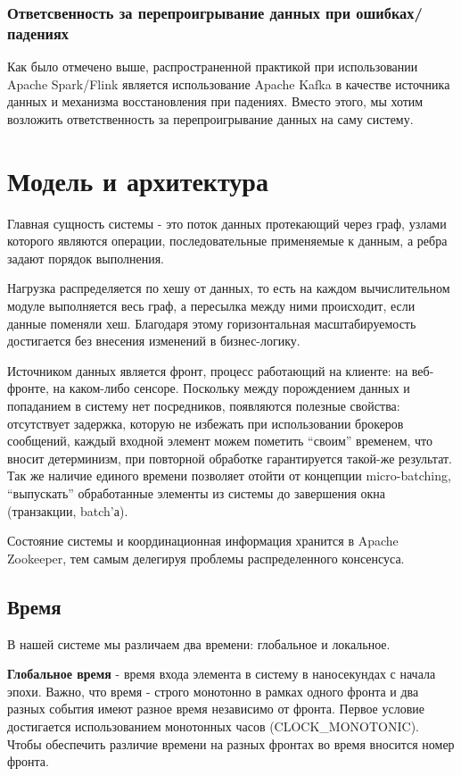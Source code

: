 \documentclass[14pt]{matmex-diploma-custom}
\begin{document}
\subsubsection{Ответсвенность за перепроигрывание данных при ошибках/падениях}

Как было отмечено выше, распространенной практикой при использовании Apache Spark/Flink является использование Apache Kafka в качестве источника данных и механизма восстановления при падениях. Вместо этого, мы хотим возложить ответственность за перепроигрывание данных на саму систему.

\section{Модель и архитектура}

Главная сущность системы - это поток данных протекающий через граф, узлами которого являются операции, последовательные применяемые к данным, а ребра задают порядок выполнения.

Нагрузка распределяется по хешу от данных, то есть на каждом вычислительном модуле выполняется весь граф, а пересылка между ними происходит, если данные поменяли хеш. Благодаря этому горизонтальная масштабируемость достигается без внесения изменений в бизнес-логику.

Источником данных является фронт, процесс работающий на клиенте: на веб-фронте, на каком-либо сенсоре. Поскольку между порождением данных и попаданием в систему нет посредников, появляются полезные свойства: отсутствует задержка, которую не избежать при использовании брокеров сообщений, каждый входной элемент можем пометить “своим” временем, что вносит детерминизм, при повторной обработке гарантируется такой-же результат. Так же наличие единого времени позволяет отойти от концепции micro-batching, “выпускать” обработанные элементы из системы до завершения окна (транзакции, batch’а).

Состояние системы и координационная информация хранится в  Apache Zookeeper, тем самым делегируя проблемы распределенного консенсуса.

\subsection{Время}

В нашей системе мы различаем два времени: глобальное и локальное.

\textbf{Глобальное время} - время входа элемента в систему в наносекундах с начала эпохи. Важно, что время - строго монотонно в рамках одного фронта и два разных события имеют разное время независимо от фронта. Первое условие достигается использованием  монотонных часов (CLOCK\_MONOTONIC). Чтобы обеспечить различие времени на разных фронтах во время вносится номер фронта.
\end{document}
